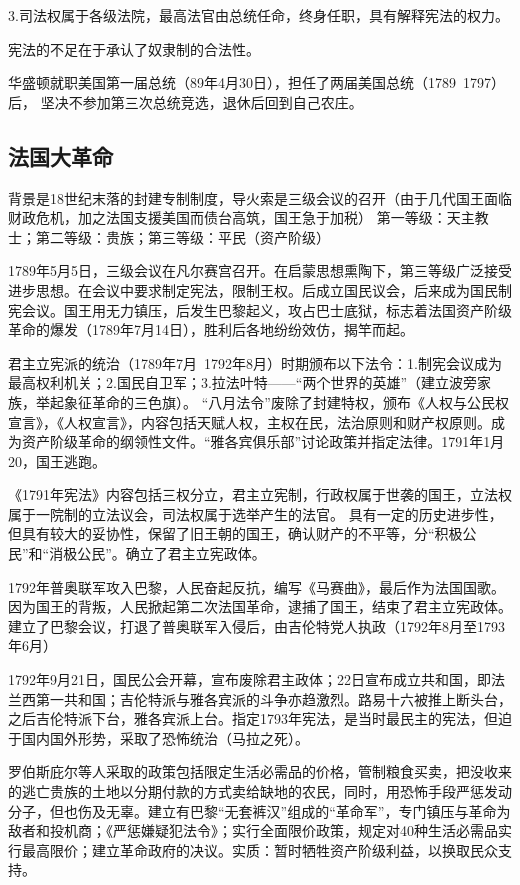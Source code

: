 3.司法权属于各级法院，最高法官由总统任命，终身任职，具有解释宪法的权力。

宪法的不足在于承认了奴隶制的合法性。

华盛顿就职美国第一届总统（89年4月30日），担任了两届美国总统（1789~1797）后， 坚决不参加第三次总统竞选，退休后回到自己农庄。

\subsection{法国大革命}
背景是18世纪末落的封建专制制度，导火索是三级会议的召开（由于几代国王面临财政危机，加之法国支援美国而债台高筑，国王急于加税）
第一等级：天主教士；第二等级：贵族；第三等级：平民（资产阶级）

1789年5月5日，三级会议在凡尔赛宫召开。在启蒙思想熏陶下，第三等级广泛接受进步思想。在会议中要求制定宪法，限制王权。后成立国民议会，后来成为国民制宪会议。国王用无力镇压，后发生巴黎起义，攻占巴士底狱，标志着法国资产阶级革命的爆发（1789年7月14日），胜利后各地纷纷效仿，揭竿而起。

君主立宪派的统治（1789年7月~1792年8月）时期颁布以下法令：1.制宪会议成为最高权利机关；2.国民自卫军；3.拉法叶特——“两个世界的英雄”（建立波旁家族，举起象征革命的三色旗）。
“八月法令”废除了封建特权，颁布《人权与公民权宣言》，《人权宣言》，内容包括天赋人权，主权在民，法治原则和财产权原则。成为资产阶级革命的纲领性文件。“雅各宾俱乐部”讨论政策并指定法律。1791年1月20，国王逃跑。

《1791年宪法》内容包括三权分立，君主立宪制，行政权属于世袭的国王，立法权属于一院制的立法议会，司法权属于选举产生的法官。
具有一定的历史进步性，但具有较大的妥协性，保留了旧王朝的国王，确认财产的不平等，分“积极公民”和“消极公民”。确立了君主立宪政体。

1792年普奥联军攻入巴黎，人民奋起反抗，编写《马赛曲》，最后作为法国国歌。因为国王的背叛，人民掀起第二次法国革命，逮捕了国王，结束了君主立宪政体。建立了巴黎会议，打退了普奥联军入侵后，由吉伦特党人执政（1792年8月至1793年6月）

1792年9月21日，国民公会开幕，宣布废除君主政体；22日宣布成立共和国，即法兰西第一共和国；吉伦特派与雅各宾派的斗争亦趋激烈。路易十六被推上断头台，之后吉伦特派下台，雅各宾派上台。指定1793年宪法，是当时最民主的宪法，但迫于国内国外形势，采取了恐怖统治（马拉之死）。

罗伯斯庇尔等人采取的政策包括限定生活必需品的价格，管制粮食买卖，把没收来的逃亡贵族的土地以分期付款的方式卖给缺地的农民，同时，用恐怖手段严惩发动分子，但也伤及无辜。建立有巴黎“无套裤汉”组成的“革命军”，专门镇压与革命为敌者和投机商；《严惩嫌疑犯法令》；实行全面限价政策，规定对40种生活必需品实行最高限价；建立革命政府的决议。实质：暂时牺牲资产阶级利益，以换取民众支持。


